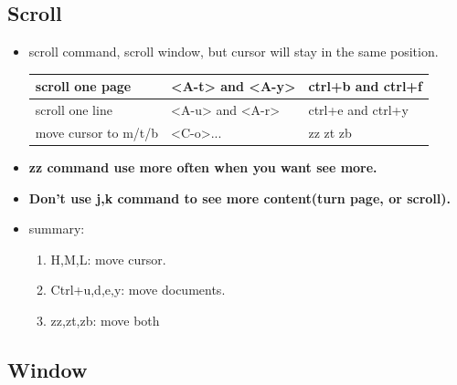 \documentclass[a4paper,11pt,twoside]{book}
\begin{document}
\subsection{Scroll}
\begin{itemize}
\item scroll command, scroll window, but cursor will stay in the same position.
\begin{center}
 \begin{tabular}{p{}|p{}|p{}}
        \hline
        scroll one  page &  <A-t> and <A-y>  & ctrl+b and  ctrl+f    \\
        
        \hline 		  
        scroll one line &  <A-u> and <A-r>  & ctrl+e and ctrl+y \\
        
         \hline 		  
        move cursor to m/t/b & <C-o>...    & zz zt zb \\
		\hline
    \end{tabular}
\end{center}
\item \textbf{zz command use more often when you want see more.}
\item \textbf{Don't use j,k command to see more content(turn page, or scroll).}
\item summary:
		\begin{enumerate}
				\item H,M,L: move cursor.

				\item Ctrl+u,d,e,y: move documents.
				\item zz,zt,zb: move both
		\end{enumerate}
\end{itemize} 

\subsection{Window}
\end{document}
